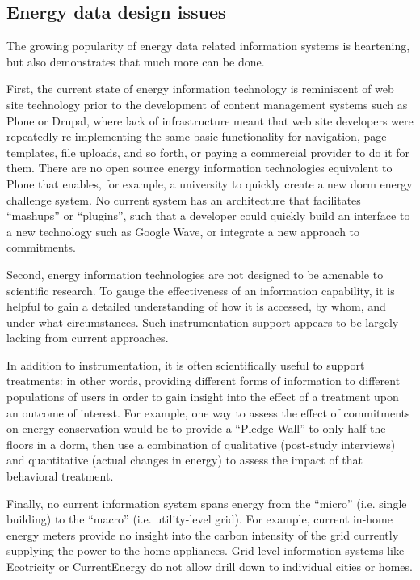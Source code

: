 \subsection{Energy data design issues}

The growing popularity of energy data related information systems is
heartening, but also demonstrates that much more can be done. 

First, the current state of energy information technology is reminiscent of
web site technology prior to the development of content management systems
such as Plone or Drupal, where lack of infrastructure meant that web site
developers were repeatedly re-implementing the same basic functionality for
navigation, page templates, file uploads, and so forth, or paying a
commercial provider to do it for them.  There are no open source energy
information technologies equivalent to Plone that enables, for example, a
university to quickly create a new dorm energy challenge system.  No
current system has an architecture that facilitates ``mashups'' or
``plugins'', such that a developer could quickly build an interface to a
new technology such as Google Wave, or integrate a new approach to
commitments.

Second, energy information technologies are not designed to be amenable to
scientific research.  To gauge the effectiveness of an information capability, it is
helpful to gain a detailed understanding of how it is accessed, by whom,
and under what circumstances.  Such instrumentation support appears to be
largely lacking from current approaches. 

In addition to instrumentation, it is often scientifically useful to
support treatments: in other words, providing different forms of
information to different populations of users in order to gain insight into
the effect of a treatment upon an outcome of interest. For example, one way
to assess the effect of commitments on energy conservation would be to
provide a ``Pledge Wall'' to only half the floors in a dorm, then use a
combination of qualitative (post-study interviews) and quantitative (actual
changes in energy) to assess the impact of that behavioral treatment.

Finally, no current information system spans energy from the ``micro''
(i.e. single building) to the ``macro'' (i.e. utility-level grid).  For
example, current in-home energy meters provide no insight into the carbon
intensity of the grid currently supplying the power to the home appliances.
Grid-level information systems like Ecotricity or CurrentEnergy do not
allow drill down to individual cities or homes.

